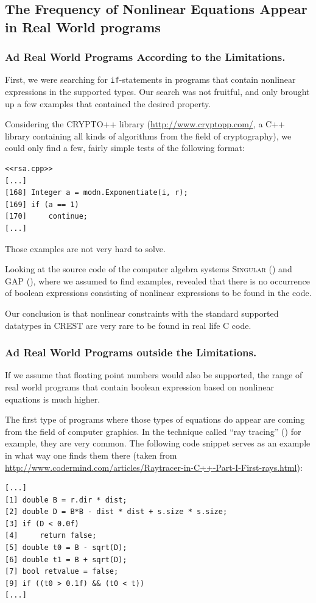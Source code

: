 \documentclass[oribibl, twocolumn]{llncs}
\begin{document}
\subsection{The Frequency of Nonlinear Equations Appear in Real World
  programs}

\subsubsection{Ad Real World Programs According to the Limitations.}
First, we were searching for \texttt{if}-statements in programs that
contain nonlinear expressions in the supported types. Our search was
not fruitful, and only brought up a few examples that contained the
desired property.

Considering the \textsc{CRYPTO++} library
(\url{http://www.cryptopp.com/}, a \textsc{C++} library containing all kinds of algorithms from the field of cryptography), we could only find a few, fairly
simple tests of the following format:

\begin{verbatim}
<<rsa.cpp>>
[...]
[168] Integer a = modn.Exponentiate(i, r);
[169] if (a == 1)
[170]     continue;
[...]
\end{verbatim}

Those examples are not very hard to solve.

Looking at the source code of the computer algebra systems \textsc{Singular} (\cite{Singular:2012})
and \textsc{GAP} (\cite{GAP4}), where we assumed to find examples,
revealed that there is no occurrence of boolean expressions consisting
of nonlinear expressions to be
found in the code.

Our conclusion is that nonlinear constraints with the standard
supported datatypes in \textsc{CREST} are very rare to be found in
real life \textsc{C} code.

\subsubsection{Ad Real World Programs outside the Limitations.}

If we assume that floating point numbers would also be supported, the
range of real world programs that contain boolean expression based on
nonlinear equations is much higher.

The first type of programs where those types of equations do appear
are coming from the field of computer graphics. In the technique called ``ray
tracing'' (\cite{glassner1989introduction}) for example, they are very common. The following code snippet serves as an example in what way one finds them there (taken from \url{http://www.codermind.com/articles/Raytracer-in-C++-Part-I-First-rays.html}):
\begin{verbatim}
[...]
[1] double B = r.dir * dist;
[2] double D = B*B - dist * dist + s.size * s.size; 
[3] if (D < 0.0f) 
[4]     return false; 
[5] double t0 = B - sqrt(D); 
[6] double t1 = B + sqrt(D);
[7] bool retvalue = false;  
[9] if ((t0 > 0.1f) && (t0 < t)) 
[...]
\end{verbatim}
\end{document}
